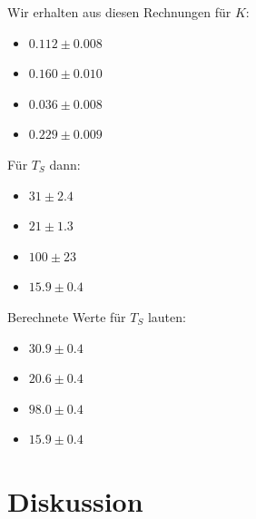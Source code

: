 \documentclass[11pt,a4paper]{article}
\begin{document}
\pagebreak

Wir erhalten aus diesen Rechnungen f\"ur $K$:
\begin{itemize}
	\item $0.112\pm0.008$
	\item $0.160\pm0.010$
	\item $0.036\pm0.008$
	\item $0.229\pm0.009$
\end{itemize}

F\"ur $T_S$ dann:
\begin{itemize}
	\item $31\pm2.4$
	\item $21\pm1.3$
	\item $100\pm23$
	\item $15.9\pm0.4$
\end{itemize}

Berechnete Werte f\"ur $T_S$ lauten:
\begin{itemize}
	\item $30.9\pm0.4$
	\item $20.6\pm0.4$
	\item $98.0\pm0.4$
	\item $15.9\pm0.4$
\end{itemize}


\section{Diskussion}
\end{document}
